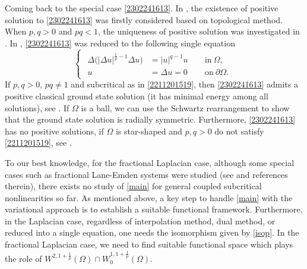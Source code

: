 \documentclass[10pt]{article}
\numberwithin{equation}{section}
\numberwithin{equation}{section}
\begin{document}
Coming back to the special case \eqref{2302241613}. In \cite{CdM2015}, the existence of positive solution to \eqref{2302241613} was firstly considered based on topological method. When $p, q>0$ and $pq<1$,  the uniqueness of positive solution was investigated in \cite{Dalmasso2000}. In \cite{BMR2012}, \eqref{2302241613} was reduced to the following single equation
\begin{equation}\label{2302241754}
\begin{cases}
\begin{aligned}
\Delta \big(|\Delta u|^{\frac1p -1}\Delta u\big) & =|u|^{q-1}u~~&& \text{in}~\Omega,\\
u & = \Delta u=0 &&\text{on}~\partial\Omega.
\end{aligned}
\end{cases}
\end{equation}
If $p, q>0$, $pq\neq 1$ and subcritical as in \eqref{2211201519}, then \eqref{2302241613} admits a positive classical ground state solution (it has minimal energy among all solutions), see \cite{BMR2012}. If $\Omega$ is a ball, we can use the Schwartz rearrangement to show that the ground state solution is radially symmetric. Furthermore, \eqref{2302241613} has no positive solutions, if $\Omega$ is star-shaped and $p, q > 0$ do not satisfy \eqref{2211201519}, see \cite{Mitidieri1993} .

\medskip
To our best knowledge, for the fractional Laplacian case, although some special cases such as fractional Lane-Emden systems were studied (see \cite{LM2019} and references therein), there exists no study of \eqref{main} for general coupled subcritical nonlinearities so far. As mentioned above, a key step to handle \eqref{main} with the variational approach is to establish a suitable functional framework. Furthermore, in the Laplacian case, regardless of interpolation method, dual method, or reduced into a single equation, one needs the isomorphism given by \eqref{isop}. In the fractional Laplacian case, we need to find suitable functional space which plays the role of $W^{2, 1+\frac1p}(\Omega)\cap W_0^{1, 1+\frac1p}(\Omega)$.
\end{document}
